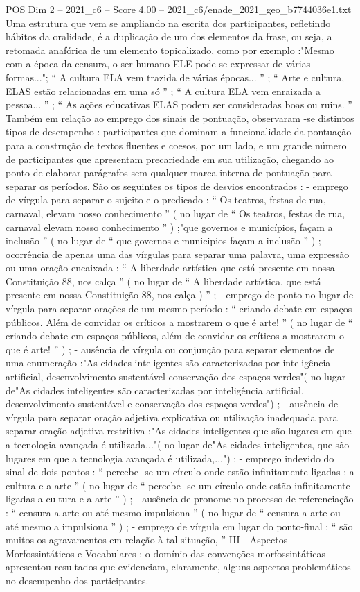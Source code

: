 \begin{textsample}{POS Dim 2 – 2021\_c6 – Score 4.00 – 2021\_c6/enade\_2021\_geo\_b7744036e1.txt}
Uma estrutura que vem se ampliando na escrita dos participantes, refletindo hábitos da oralidade, é a duplicação de um dos elementos da frase, ou seja, a retomada anafórica de um elemento topicalizado, como por exemplo :"Mesmo com a época da censura, o ser humano ELE pode se expressar de várias formas..."; “ A cultura ELA vem trazida de várias épocas... ” ; “ Arte e cultura, ELAS estão relacionadas em uma só ” ; “ A cultura ELA vem enraizada a pessoa... ” ; “ As ações educativas ELAS podem ser consideradas boas ou ruins. ” Também em relação ao emprego dos sinais de pontuação, observaram -se distintos tipos de desempenho : participantes que dominam a funcionalidade da pontuação para a construção de textos fluentes e coesos, por um lado, e um grande número de participantes que apresentam precariedade em sua utilização, chegando ao ponto de elaborar parágrafos sem qualquer marca interna de pontuação para separar os períodos.
São os seguintes os tipos de desvios encontrados : - emprego de vírgula para separar o sujeito e o predicado : “ Os teatros, festas de rua, carnaval, elevam nosso conhecimento ” ( no lugar de “ Os teatros, festas de rua, carnaval elevam nosso conhecimento ” ) ;"que governos e municípios, façam a inclusão ” ( no lugar de “ que governos e municipios façam a inclusão ” ) ; - ocorrência de apenas uma das vírgulas para separar uma palavra, uma expressão ou uma oração encaixada : “ A liberdade artística que está presente em nossa Constituição 88, nos calça ” ( no lugar de “ A liberdade artística, que está presente em nossa Constituição 88, nos calça ) ” ; - emprego de ponto no lugar de vírgula para separar orações de um mesmo período : “ criando debate em espaços públicos.
Além de convidar os críticos a mostrarem o que é arte! ” ( no lugar de “ criando debate em espaços públicos, além de convidar os críticos a mostrarem o que é arte! ” ) ; - ausência de vírgula ou conjunção para separar elementos de uma enumeração :"As cidades inteligentes são caracterizadas por inteligência artificial, desenvolvimento sustentável conservação dos espaços verdes"( no lugar de"As cidades inteligentes são caracterizadas por inteligência artificial, desenvolvimento sustentável e conservação dos espaços verdes") ; - ausência de vírgula para separar oração adjetiva explicativa ou utilização inadequada para separar oração adjetiva restritiva :"As cidades inteligentes que são lugares em que a tecnologia avançada é utilizada..."( no lugar de"As cidades inteligentes, que são lugares em que a tecnologia avançada é utilizada,...") ; - emprego indevido do sinal de dois pontos : “ percebe -se um círculo onde estão infinitamente ligadas : a cultura e a arte ” ( no lugar de “ percebe -se um círculo onde estão infinitamente ligadas a cultura e a arte ” ) ; - ausência de pronome no processo de referenciação : “ censura a arte ou até mesmo impulsiona ” ( no lugar de “ censura a arte ou até mesmo a impulsiona ” ) ; - emprego de vírgula em lugar do ponto-final : “ são muitos os agravamentos em relação à tal situação, ” III - Aspectos Morfossintáticos e Vocabulares : o domínio das convenções morfossintáticas apresentou resultados que evidenciam, claramente, alguns aspectos problemáticos no desempenho dos participantes.

\end{textsample}
